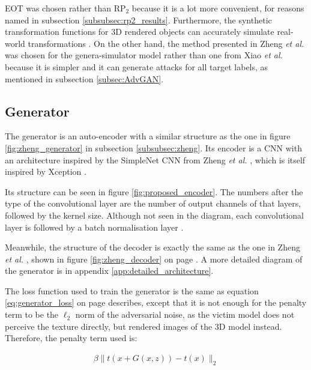EOT \cite{athalye} was chosen rather than $\textrm{RP}_2$ \cite{evtimov_road_signs} because it is a lot more convenient, for reasons named in subsection \ref{subsubsec:rp2_results}. Furthermore, the synthetic transformation functions for 3D rendered objects can accurately simulate real-world transformations \cite{athalye}. On the other hand, the method presented in Zheng \textit{et al.} \cite{zheng_black_box_GAN} was chosen for the genera-simulator model rather than one from Xiao \textit{et al.} \cite{advGAN} because it is simpler and it can generate attacks for all target labels, as mentioned in subsection \ref{subsec:AdvGAN}.

\subsection{Generator}

The generator is an auto-encoder with a similar structure as the one in figure \ref{fig:zheng_generator} in subsection \ref{subsubsec:zheng}. Its encoder is a CNN with an architecture inspired by the SimpleNet CNN from Zheng \textit{et al.} \cite{zheng_black_box_GAN}, which is itself inspired by Xception \cite{xception}. 

Its structure can be seen in figure \ref{fig:proposed_encoder}. The numbers after the type of the convolutional layer are the number of output channels of that layers, followed by the kernel size. Although not seen in the diagram, each convolutional layer is followed by a batch normalisation layer \cite{batch_norm}.

Meanwhile, the structure of the decoder is exactly the same as the one in Zheng \textit{et al.} \cite{zheng_black_box_GAN}, shown in figure \ref{fig:zheng_decoder} on page \pageref{fig:zheng_decoder}. A more detailed diagram of the generator is in appendix \ref{app:detailed_architecture}.

The loss function used to train the generator is the same as equation \ref{eq:generator_loss} on page \pageref{eq:generator_loss} describes, except that it is not enough for the penalty term to be the $\ell_2$ norm of the adversarial noise, as the victim model does not perceive the texture directly, but rendered images of the 3D model instead. Therefore, the penalty term used is:

\begin{equation}
    \label{eq:g-eot-l2-loss}
    \begin{aligned}
    \beta\|t(x + G(x,z)) - t(x)\|_2
    \end{aligned}
\end{equation}

